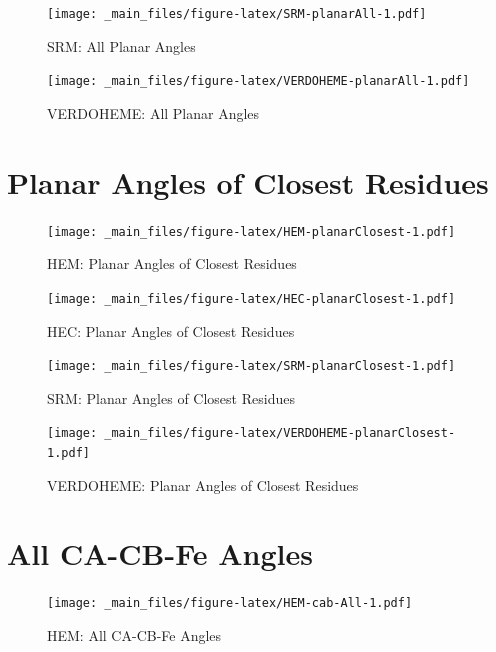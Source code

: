 \documentclass[a4paper, nobind]{templates/ociamthesis}
\begin{document}
\begin{figure}
\centering
\texttt{[image: \_main\_files/figure-latex/SRM-planarAll-1.pdf]}
\caption{\label{fig:SRM-planarAll}SRM: All Planar Angles}
\end{figure}

\begin{figure}
\centering
\texttt{[image: \_main\_files/figure-latex/VERDOHEME-planarAll-1.pdf]}
\caption{\label{fig:VERDOHEME-planarAll}VERDOHEME: All Planar Angles}
\end{figure}

\hypertarget{figs-planarClosest}{%
\section{Planar Angles of Closest Residues}\label{figs-planarClosest}}

\begin{figure}
\centering
\texttt{[image: \_main\_files/figure-latex/HEM-planarClosest-1.pdf]}
\caption{\label{fig:HEM-planarClosest}HEM: Planar Angles of Closest Residues}
\end{figure}

\begin{figure}
\centering
\texttt{[image: \_main\_files/figure-latex/HEC-planarClosest-1.pdf]}
\caption{\label{fig:HEC-planarClosest}HEC: Planar Angles of Closest Residues}
\end{figure}

\begin{figure}
\centering
\texttt{[image: \_main\_files/figure-latex/SRM-planarClosest-1.pdf]}
\caption{\label{fig:SRM-planarClosest}SRM: Planar Angles of Closest Residues}
\end{figure}

\begin{figure}
\centering
\texttt{[image: \_main\_files/figure-latex/VERDOHEME-planarClosest-1.pdf]}
\caption{\label{fig:VERDOHEME-planarClosest}VERDOHEME: Planar Angles of Closest Residues}
\end{figure}

\hypertarget{figs-cabAll}{%
\section{All CA-CB-Fe Angles}\label{figs-cabAll}}

\begin{figure}
\centering
\texttt{[image: \_main\_files/figure-latex/HEM-cab-All-1.pdf]}
\caption{\label{fig:HEM-cab-All}HEM: All CA-CB-Fe Angles}
\end{figure}
\end{document}
